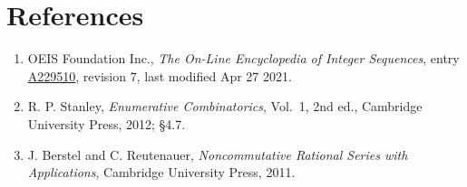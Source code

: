 \documentclass[11pt]{article}
\theoremstyle{definition}
\begin{document}
\section{References}

\begin{enumerate}

\item OEIS Foundation Inc., \emph{The On-Line Encyclopedia of Integer Sequences}, entry \href{https://oeis.org/A229510}{A229510}, revision 7, last modified Apr 27 2021.

\item R. P. Stanley, \emph{Enumerative Combinatorics}, Vol.~1, 2nd ed., Cambridge University Press, 2012; \S4.7.

\item J. Berstel and C. Reutenauer, \emph{Noncommutative Rational Series with Applications}, Cambridge University Press, 2011.

\end{enumerate}
\end{document}
